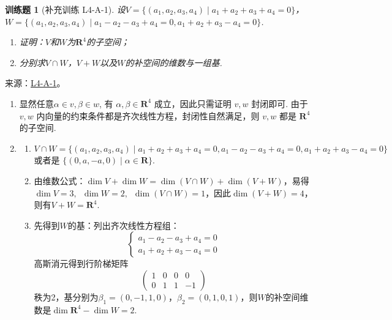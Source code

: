 \documentclass[12pt,fontset=fandol]{ctexart}
\newtheorem{exercise}{训练题}[section]
\begin{document}
\begin{exercise}[补充训练 L4-A-1]\label{prob:L4-A-1}
设$V=\{(a_1,a_2,a_3,a_4) \mid a_1+a_2+a_3+a_4=0\}$，$W=\{(a_1,a_2,a_3,a_4) \mid a_1-a_2-a_3+a_4=0,a_1+a_2+a_3-a_4=0\}$.
        \begin{enumerate}
            \item 证明：$V$和$W$为$\mathbf{R}^4$的子空间；
            \item 分别求$V \cap W$，$V+W$以及$W$的补空间的维数与一组基.
        \end{enumerate}
\end{exercise}
\noindent 来源：\href{https://github.com/yhwu-is/Linear-Algebra-Left-Undone/blob/new/%E8%AE%B2%E4%B9%89/%E4%B8%93%E9%A2%98/4%20%E7%BA%BF%E6%80%A7%E7%A9%BA%E9%97%B4%E7%9A%84%E8%BF%90%E7%AE%97.tex}{L4-A-1}。
\begin{solve}
\begin{enumerate}
                \item 显然任意$\alpha\in v,\beta \in w$, 有 $\alpha,\beta\in \mathbf{R}^4$ 成立，因此只需证明 $v,w$ 封闭即可. 由于 $v,w$ 内向量的约束条件都是齐次线性方程，封闭性自然满足，则 $v,w$ 都是 $\mathbf{R}^4$ 的子空间.

                \item \begin{enumerate}
                          \item $V\cap W=\{(a_1,a_2,a_3,a_4) \mid a_1+a_2+a_3+a_4=0,a_1-a_2-a_3+a_4=0,a_1+a_2+a_3-a_4=0\}$ 或者是 $\{(0,a,-a,0) \mid \alpha\in \mathbf{R}\}$.

                          \item 由维数公式：$\dim V+\dim W=\dim (V\cap W)+\dim (V+W)$，易得$\dim V=3,\enspace \dim W=2,\enspace \dim (V\cap W)=1$，因此$\dim (V+W)=4$，则有$V+W=\mathbf{R}^4$.

                          \item 先得到$W$的基：列出齐次线性方程组：
                                \[\begin{cases}
                                        a_1-a_2-a_3+a_4=0 \\
                                        a_1+a_2+a_3-a_4=0\end{cases}
                                \]
                                高斯消元得到行阶梯矩阵
                                \[\begin{pmatrix}
                                        1 & 0 & 0 & 0  \\
                                        0 & 1 & 1 & -1
                                    \end{pmatrix}\]
                                秩为2，基分别为$\beta_1= (0,-1,1,0)$，$\beta_2= (0,1,0,1)$，则$W$的补空间维数是$\dim \mathbf{R}^4 - \dim W=2$.


\end{enumerate}
\end{enumerate}
\end{solve}
\end{document}
